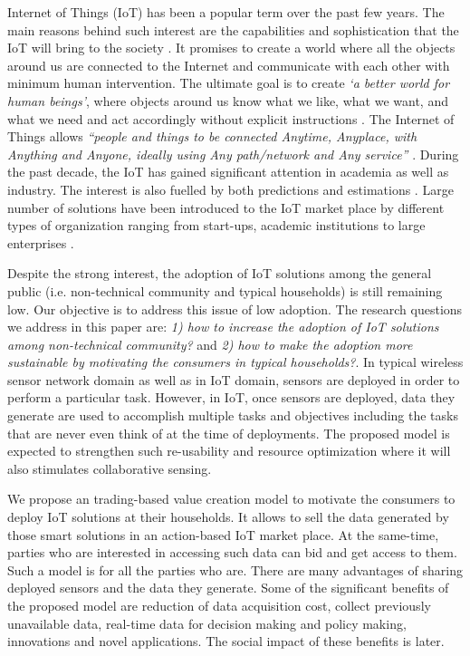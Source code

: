 \documentclass[conference]{IEEEtran}
\begin{document}
Internet of Things (IoT) has been a popular term over the past few years.  The main reasons behind such interest are the capabilities and sophistication that the IoT will bring to the society \cite{P003}. It promises to create a world where all the objects around us are connected to the Internet and communicate with each other with minimum human intervention. The ultimate goal is to create \textit{`a better world for human beings'}, where objects around us know what we like, what we want, and what we need and act accordingly without explicit instructions \cite{P040}. The Internet of Things allows \textit{``people and things to be connected Anytime, Anyplace, with Anything and Anyone, ideally using Any path/network and Any service''} \cite{P029}. During the past decade, the IoT has gained significant attention in academia as well as industry. The interest is also fuelled by both predictions and estimations \cite{ZMP003}. Large number of solutions have been introduced to the IoT market place by different types of organization ranging from start-ups, academic institutions to large enterprises \cite{P596}. 

Despite the strong interest, the adoption of IoT solutions among the general public (i.e. non-technical community and typical households) is still remaining low. Our objective is to address this issue of low adoption. The research questions we address in this paper are: \textit{1) how to increase the adoption of IoT solutions among non-technical community?} and  \textit{2) how to make the adoption more sustainable by motivating the consumers in typical households?}. In typical wireless sensor network domain as well as in IoT domain, sensors are deployed in order to perform a particular task. However, in IoT, once sensors are deployed, data they generate are used to accomplish multiple tasks and objectives including the tasks that are never even think of at the time of deployments. The proposed model is expected to strengthen  such re-usability and resource optimization where it will also stimulates collaborative sensing.

We propose an trading-based value creation model to motivate the consumers to deploy IoT solutions at their households. It allows to sell the data generated by those smart solutions in an action-based IoT market place. At the same-time, parties who are interested in accessing such data can bid and get access to them. Such a model is  for all the parties who are. There are many advantages of sharing deployed sensors and the data they generate. Some of the significant  benefits of the proposed model are reduction of data acquisition cost, collect  previously unavailable data, real-time data for decision making and policy making, innovations and novel applications. The social impact of these benefits is  later.
\end{document}
